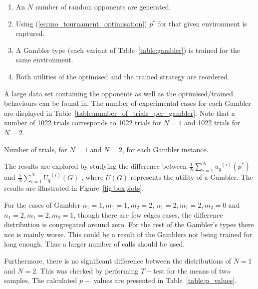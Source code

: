 \documentclass[10pt]{article}
\begin{document}
\begin{enumerate}
    \item An \(N\) number of random opponents are generated.
    \item Using (\ref{eq:mo_tournament_optimisation}) \(p^*\) for that given environment is captured.
    \item A Gambler type (each variant of Table~\ref{table:gambler}) is trained for the same environment.
    \item Both utilities of the optimised and the trained strategy are reordered.
\end{enumerate}

A large data set containing the opponents as well as the optimised/trained behaviours
can be found in. %
The number of experimental cases for each Gambler are displayed in Table~\ref{table:number_of_trials_per_gambler}.
Note that a number of 1022 trials corresponds to 1022 trials for \(N=1\) and 1022
trials for \(N=2\).

\begin{table}[htbp]
    \begin{center}
    
    \caption{Number of trials, for \(N=1\) and \(N=2\), for each Gambler instance.}
    \label{table:number_of_trials_per_gambler}
    \end{center}
\end{table}

The results are explored by studying the difference between
\(\frac{1}{N} \sum\limits_{i=1} ^ {N} {u_q}^{(i)} (p ^ *)\) and
\(\frac{1}{N} \sum\limits_{i=1} ^ {N} {U_q}^{(i)} (G)\) ,
where \(U(G)\) represents the utility of a Gambler. The results are illustrated in
Figure~\ref{fig:boxplots}.

For the cases of Gambler \(n_1=1, m_1=1, m_2=2\), \(n_1=2, m_1=2, m_2=0\) and
\(n_1=2, m_1=2, m_2=1\), though there are few edges cases, the difference distribution
is congregated around zero. For the rest of the Gambler's types there nce is mainly worse.
This could be a result of the Gamblers not being trained for long enough. Thus a larger
number of calls should be used. %

Furthermore, there is no significant difference between the distributions of
\(N=1\) and \(N=2\). This was checked by performing \(T-\)test for the means of two
samples. The calculated \(p-\) values are presented in Table~\ref{table:p_values}.
\end{document}
